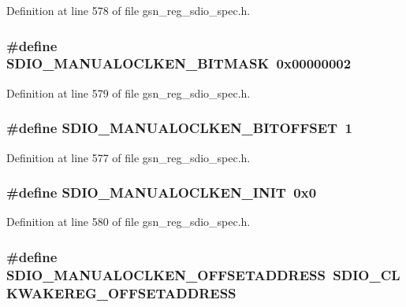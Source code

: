 Definition at line 578 of file gsn\_\-reg\_\-sdio\_\-spec.h.

\hypertarget{a00571_a1b1ec7f11bf8a76283a899e9cb9bd992}{
\subsubsection[{SDIO\_\-MANUALOCLKEN\_\-BITMASK}]{\setlength{\rightskip}{0pt plus 5cm}\#define SDIO\_\-MANUALOCLKEN\_\-BITMASK~0x00000002}}
\label{a00571_a1b1ec7f11bf8a76283a899e9cb9bd992}


Definition at line 579 of file gsn\_\-reg\_\-sdio\_\-spec.h.

\hypertarget{a00571_ac12c74d6292d9b4471297c0a758bd957}{
\subsubsection[{SDIO\_\-MANUALOCLKEN\_\-BITOFFSET}]{\setlength{\rightskip}{0pt plus 5cm}\#define SDIO\_\-MANUALOCLKEN\_\-BITOFFSET~1}}
\label{a00571_ac12c74d6292d9b4471297c0a758bd957}


Definition at line 577 of file gsn\_\-reg\_\-sdio\_\-spec.h.

\hypertarget{a00571_a0be3e89c7c25f8afed9739065e5aba72}{
\subsubsection[{SDIO\_\-MANUALOCLKEN\_\-INIT}]{\setlength{\rightskip}{0pt plus 5cm}\#define SDIO\_\-MANUALOCLKEN\_\-INIT~0x0}}
\label{a00571_a0be3e89c7c25f8afed9739065e5aba72}


Definition at line 580 of file gsn\_\-reg\_\-sdio\_\-spec.h.

\hypertarget{a00571_a5379082277544a3bf9851a3b260d6923}{
\subsubsection[{SDIO\_\-MANUALOCLKEN\_\-OFFSETADDRESS}]{\setlength{\rightskip}{0pt plus 5cm}\#define SDIO\_\-MANUALOCLKEN\_\-OFFSETADDRESS~SDIO\_\-CLKWAKEREG\_\-OFFSETADDRESS}}
\label{a00571_a5379082277544a3bf9851a3b260d6923}



